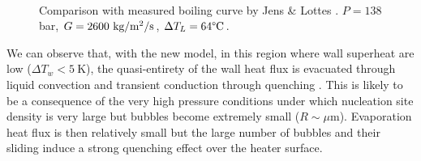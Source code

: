 \begin{figure}[!h]
\centering
{}\\
\caption{Comparison with measured boiling curve by Jens \& Lottes \cite{jens_analysis_1951}. $P=138$ bar, $G=2600~\text{kg/m$^{2}$/s}$, $\Delta T_{L}=64\degree\mathrm{C}$.}
\label{fig:HFP_jens_BC}
\end{figure}
\npar


We can observe that, with the new model, in this region where wall superheat are low ($\Delta T_{w}<5\ $K), the quasi-entirety of the wall heat flux is evacuated through liquid convection and transient conduction through quenching . This is likely to be a consequence of the very high pressure conditions under which nucleation site density is very large but bubbles become extremely small ($R \sim \mu$m). Evaporation heat flux is then relatively small but the large number of bubbles and their sliding induce a strong quenching effect over the heater surface. 


